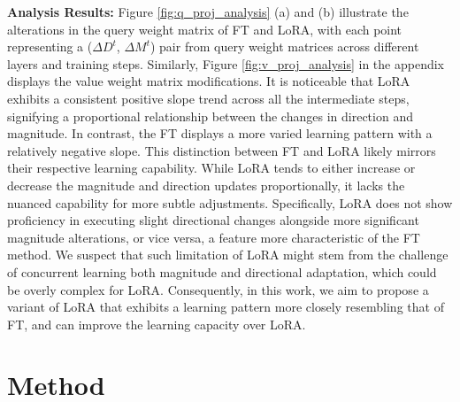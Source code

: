 \documentclass{article}
\newcommand{\ours}{DoRA}
\theoremstyle{plain}
\theoremstyle{definition}
\theoremstyle{remark}
\def\authornote#1#2#3{{\textcolor{#2}{\textsl{\small[#1: #3]}}}}
\newcommand{\PM}[1]{\authornote{Pavlo}{blue}{#1}}
\newcommand{\yin}[1]{\authornote{danny}{cyan}{#1}}
\begin{document}
\textbf{Analysis Results:} Figure \ref{fig:q_proj_analysis} (a) and (b) illustrate the alterations in the query weight matrix of FT and LoRA, with each point representing a ($\Delta D^{t}$, $\Delta M^{t}$) pair from query weight matrices across different layers and training steps. Similarly, Figure \ref{fig:v_proj_analysis} in the appendix displays the value weight matrix modifications. It is noticeable that LoRA exhibits a consistent positive slope trend across all the intermediate steps, signifying a proportional relationship between the changes in direction and magnitude. In contrast, the FT displays a more varied learning pattern with a relatively negative slope. This distinction between FT and LoRA likely mirrors their respective learning capability. While LoRA tends to either increase or decrease the magnitude and direction updates proportionally, it lacks the nuanced capability for more subtle adjustments. Specifically, LoRA does not show proficiency in executing slight directional changes alongside more significant magnitude alterations, or vice versa, a feature more characteristic of the FT method. We suspect that such limitation of LoRA might stem from the challenge of concurrent learning both magnitude and directional adaptation, which could be overly complex for LoRA. Consequently, in this work, we aim to propose a variant of LoRA that exhibits a learning pattern more closely resembling that of FT, and can improve the learning capacity over LoRA. 


\section{Method} 
\end{document}
